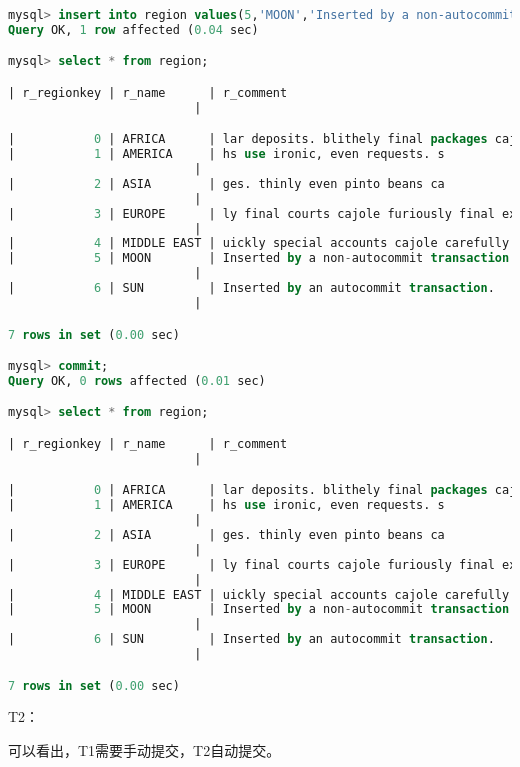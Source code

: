 \documentclass{article}
\begin{document}
\begin{lstlisting}[language=sql]
mysql> insert into region values(5,'MOON','Inserted by a non-autocommit transaction.');
Query OK, 1 row affected (0.04 sec)

mysql> select * from region;

| r_regionkey | r_name      | r_comment
                          |

|           0 | AFRICA      | lar deposits. blithely final packages cajole. regular waters are final requests. regular accounts are according to  |
|           1 | AMERICA     | hs use ironic, even requests. s
                          |
|           2 | ASIA        | ges. thinly even pinto beans ca
                          |
|           3 | EUROPE      | ly final courts cajole furiously final excuse
                          |
|           4 | MIDDLE EAST | uickly special accounts cajole carefully blithely close requests. carefully final asymptotes haggle furiousl        |
|           5 | MOON        | Inserted by a non-autocommit transaction.
                          |
|           6 | SUN         | Inserted by an autocommit transaction.
                          |

7 rows in set (0.00 sec)

mysql> commit;
Query OK, 0 rows affected (0.01 sec)

mysql> select * from region;

| r_regionkey | r_name      | r_comment
                          |

|           0 | AFRICA      | lar deposits. blithely final packages cajole. regular waters are final requests. regular accounts are according to  |
|           1 | AMERICA     | hs use ironic, even requests. s
                          |
|           2 | ASIA        | ges. thinly even pinto beans ca
                          |
|           3 | EUROPE      | ly final courts cajole furiously final excuse
                          |
|           4 | MIDDLE EAST | uickly special accounts cajole carefully blithely close requests. carefully final asymptotes haggle furiousl        |
|           5 | MOON        | Inserted by a non-autocommit transaction.
                          |
|           6 | SUN         | Inserted by an autocommit transaction.
                          |

7 rows in set (0.00 sec)
\end{lstlisting}

T2：

可以看出，T1需要手动提交，T2自动提交。
\end{document}
